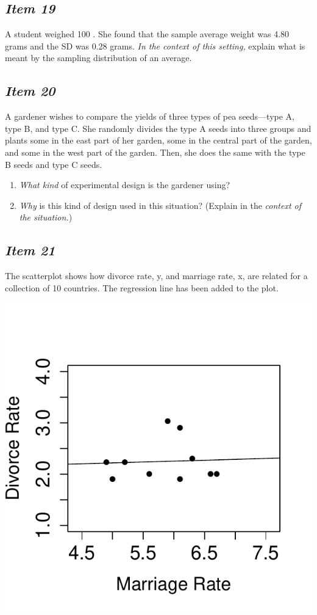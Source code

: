 \subsection{\textbf{\textit{Item 19}}}
A student weighed 100 .  She found that the sample average weight was 4.80 grams and the SD was 0.28 grams. \textit{In the context of this setting,} explain what is meant by the sampling distribution of an average.

\subsection{\textbf{\textit{Item 20}}}
A gardener wishes to compare the yields of three types of pea seeds---type A, type B, and type C.  She randomly divides the type A seeds into three groups and plants some in the east part of her garden, some in the central part of the garden, and some in the west part of the garden.  Then, she does the same with the type B seeds and type C seeds.
\begin{enumerate}[leftmargin=1cm, itemsep=.2em]
\item \textit{What kind} of experimental design is the gardener using?
\item \textit{Why} is this kind of design used in this situation?  (Explain in the \textit{context of the situation.})
\end{enumerate}

\subsection{\textbf{\textit{Item 21}}}
The scatterplot shows how divorce rate, y, and marriage rate, x, are related for a collection of 10 countries.  The regression line has been added to the plot.

\begin{marginfigure}
\centering
\includegraphics{includes/Item13_R.pdf}
\end{marginfigure}

